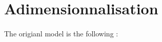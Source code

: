 \documentclass{article}
\begin{document}
 









\newpage
{}
%
%
%


%




\newpage
\appendix
{}

\newpage
\section{Adimensionnalisation}
\label{adim}

\paragraph{}
The origianl model is the following :
\end{document}
